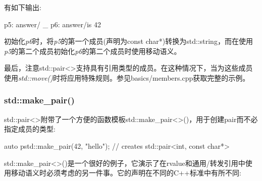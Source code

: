 有如下输出:

\begin{shell}
p5: answer/ _
p6: answer/is 42
\end{shell}

初始化\textit{p6}时，将\textit{p5}的第一个成员(声明为const char*)转换为std::string，而在使用\textit{p5}的第二个成员初始化\textit{p6}的第二个成员时使用移动语义。

最后，注意std::pair<>支持具有引用类型的成员。在这种情况下，当为这些成员使用\textit{std::move()}时将应用特殊规则。参见basics/members.cpp获取完整的示例。

\subsubsection{std::make_pair()}

std::pair<>附带了一个方便的函数模板std::make_pair<>()，用于创建pair而不必指定成员的类型:

\begin{cppcode}
auto p{std::make_pair(42, "hello")}; // creates std::pair<int, const char*>
\end{cppcode}

std::make_pair<>()是一个很好的例子，它演示了在rvalue和通用/转发引用中使用移动语义时必须考虑的另一件事。它的声明在不同的C++标准中有所不同:

